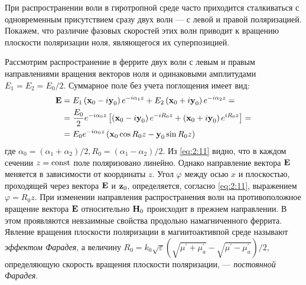 При распространении воли в гиротропной среде часто приходится сталкиваться с одновременным присутствием сразу двух волн
— с левой и правой поляризацией. Покажем, что различие фазовых скоростей этих волн приводит к вращению плоскости
поляризации ноля, являющегося их суперпозицией.

Рассмотрим распространение в феррите двух волн с левым и правым направлениями вращения векторов ноля и одинаковыми
амплитудами $E_1 = E_2=E_0/2$. Суммарное поле без учета поглощения имеет вид:
\begin{equation}
\begin{aligned} 
    \textbf{E} &=E_{1}\left(\textbf{x}_{0}-i \textbf{y}_{0}\right) e^{-i \alpha_{1} z}+E_{2}\left(\textbf{x}_{0}+i \textbf{y}_{0}\right) e^{-i \alpha_{2} z}=\\
    &=\frac{E_{0}}{2} e^{-i \alpha_{0} z}\left[\left(\textbf{x}_{0}-i \textbf{y}_{0}\right) e^{-i R_{0} z}+\left(\textbf{x}_{0}+i \textbf{y}_{0}\right) e^{i R_{0} z}\right]=\\
    &=E_{0} e^{-i \alpha_{0} z}\left(\textbf{x}_{0} \cos R_{0} z-\textbf{y}_{0} \sin R_{0} z\right)
 \end{aligned}
    \label{eq:2:11}
\end{equation} 
где $\alpha_{0}=\left(\alpha_{1}+\alpha_{2}\right) / 2, R_{0}=\left(\alpha_{1}-\alpha_{2}\right) / 2$. Из \eqref{eq:2:11} видно,
что в каждом сечении $z = \text{\rmfamily\upshape const}$ поле поляризовано линейно. Однако направление вектора $\textbf{E}$ меняется в зависимости от
координаты $z$. Угол $\varphi$ между осью $x$ и плоскостью, проходящей через
вектора $\textbf{E}$ и $\textbf{z}_0$, определяется, согласно \eqref{eq:2:11}, выражением $\varphi=R_{0} z$. При изменении направления распространения волн на
противоположное вращение вектора $\textbf{E}$ относительно $\textbf{H}_0$ происходит в прежнем направлении. В этом проявляются невзаимные
свойства продольно намагниченного феррита. Явление вращения плоскости поляризации в магиитоактивпой
среде называют \textit{эффектом Фарадея}, а величину $R_{0}=k_{0}
\sqrt{\varepsilon}(\sqrt{\mu^{\prime}+\mu_{a}^{\prime}}-\sqrt{\mu^{\prime}-\mu_{a}^{\prime}}) / 2$, определяющую
скорость вращения плоскости поляризации, — \textit{постоянной Фарадея}.

